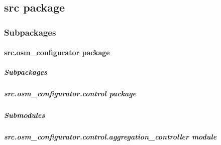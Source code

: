 \documentclass[letterpaper,10pt,english]{sphinxmanual}
\begin{document}
\subsection{src package}
\label{\detokenize{apidoc/src:src-package}}\label{\detokenize{apidoc/src::doc}}

\subsubsection{Subpackages}
\label{\detokenize{apidoc/src:subpackages}}
\sphinxstepscope


\paragraph{src.osm\_configurator package}
\label{\detokenize{apidoc/src.osm_configurator:src-osm-configurator-package}}\label{\detokenize{apidoc/src.osm_configurator::doc}}

\subparagraph{Subpackages}
\label{\detokenize{apidoc/src.osm_configurator:subpackages}}
\sphinxstepscope


\subparagraph{src.osm\_configurator.control package}
\label{\detokenize{apidoc/src.osm_configurator.control:src-osm-configurator-control-package}}\label{\detokenize{apidoc/src.osm_configurator.control::doc}}

\subparagraph{Submodules}
\label{\detokenize{apidoc/src.osm_configurator.control:submodules}}

\subparagraph{src.osm\_configurator.control.aggregation\_controller module}
\label{\detokenize{apidoc/src.osm_configurator.control:module-src.osm_configurator.control.aggregation_controller}}\label{\detokenize{apidoc/src.osm_configurator.control:src-osm-configurator-control-aggregation-controller-module}}
\end{document}
